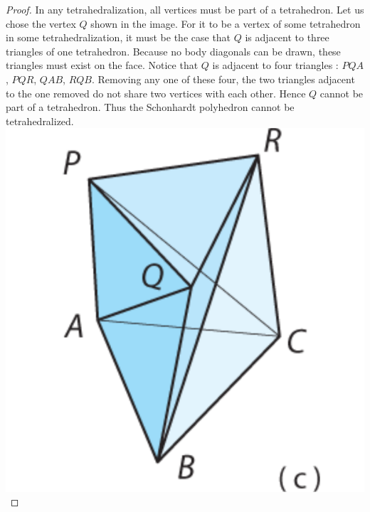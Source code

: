 \documentclass[12pt]{article}
\theoremstyle{definition}
\begin{document}
\begin{proof}
In any tetrahedralization, all vertices must be part of a tetrahedron. Let us chose the vertex $Q$ shown in the image. For it to be a vertex of some tetrahedron in some tetrahedralization, it must be the case that $Q$ is adjacent to three triangles of one tetrahedron. Because no body diagonals can be drawn, these triangles must exist on the face. Notice that $Q$ is adjacent to four triangles : $PQA$, $PQR$, $QAB$, $RQB$. Removing any one of these four, the two triangles adjacent to the one removed do not share two vertices with each other. Hence $Q$ cannot be part of a tetrahedron. Thus the Schonhardt polyhedron cannot be tetrahedralized.\\


\includegraphics[scale=0.5]{schoonhardt.png} 


\end{proof}
\end{document}
